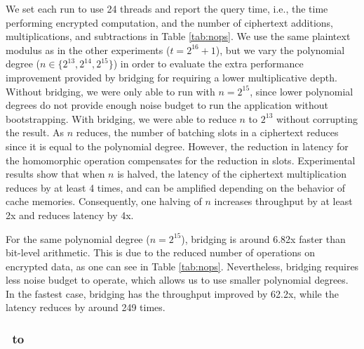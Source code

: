 We set each run to use 24 threads and report the query time, i.e., the time performing encrypted computation, and the number of ciphertext additions, multiplications, and subtractions in Table \ref{tab:nops}. We use the same plaintext modulus as in the other experiments ($t = 2^{16}+1$), but we vary the polynomial degree ($n \in \{2^{13}, 2^{14}, 2^{15}\}$) in order to evaluate the extra performance improvement provided by bridging for requiring a lower multiplicative depth.
Without bridging, we were only able to run with $n = 2^{15}$, since lower polynomial degrees do not provide enough noise budget to run the application without bootstrapping. %
With bridging, we were able to reduce $n$ to $2^{13}$ without corrupting the result.
As $n$ reduces, the number of batching slots in a ciphertext reduces since it is equal to the polynomial degree. However, the reduction in latency for the homomorphic operation compensates for the reduction in slots. Experimental results show that when $n$ is halved, the latency of the ciphertext multiplication reduces by at least 4 times, and can be amplified depending on the behavior of cache memories. Consequently, one halving of $n$ increases throughput by at least 2x and reduces latency by 4x.

For the same polynomial degree ($n = 2^{15}$), bridging is around 6.82x faster than bit-level arithmetic. This is due to the reduced number of operations on encrypted data, as one can see in Table \ref{tab:nops}.
Nevertheless, bridging requires less noise budget to operate, which allows us to use smaller polynomial degrees. In the fastest case, bridging has the throughput improved by 62.2x, while the latency reduces by around 249 times.
\vspace{-0.1cm}


\subsubsection{\secint\ to \secmod{}}\label{sss:secint2secmod}


